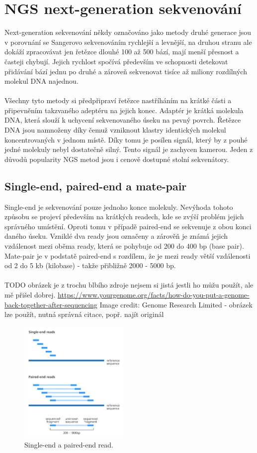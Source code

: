 \documentclass[czech,DP]{thesiskiv}
\numberwithin{equation}{section}
\begin{document}
\section{NGS next-generation sekvenování}
Next-generation sekvenování někdy označováno jako metody druhé generace jsou v porovnání se Sangerovo sekvenováním rychlejší a levnější, na druhou stranu ale dokáží zpracovávat jen řetězce dlouhé 100 až 500 bází, mají menší přesnost a časteji chybují. Jejich rychlost spočívá především ve schopnosti detekovat přidávání bází jednu po druhé a zároveň sekvenovat tisíce až miliony rozdílných molekul DNA najednou. 
\\
\\
Všechny tyto metody si předpřipraví řetězce nastříháním na krátké části a připevněním takzvaného adeptéru na jejich konec. Adaptér je krátká molekula DNA, která slouží k uchycení sekvenovaného úseku na pevný povrch. Řetězce DNA jsou namnoženy díky čemuž vzniknout klastry identických molekul koncentrovaných v jednom místě. Díky tomu je posílen signál, který by z pouhé jedné molekuly nebyl dostatečně silný. Tento signál je zachycen kamerou. Jeden z důvodů popularity NGS metod jsou i cenově dostupné stolní sekvenátory.
 
\subsection{Single-end, paired-end a mate-pair}
Single-end je sekvenování pouze jednoho konce molekuly. Nevýhoda tohoto způsobu se projeví především na krátkých readech, kde se zvýší problém jejich správného umístění. Oproti tomu v případě paired-end se sekvenuje z obou konci daného úseku. Vzniklé dva ready jsou označeny a zárověň je známá jejich vzdálenost mezi oběma ready, která se pohybuje od 200 do 400 bp (base pair). Mate-pair je v podstatě paired-end s rozdílem, že je mezi ready větší vzdálenosti od 2 do 5 kb (kilobase) - takže přibližně 2000 - 5000 bp. \cite{illumina}  
\\
\\
TODO obrázek je z trochu blbího zdroje nejsem si jistá jestli ho můžu použít, ale mě přišel dobrej. \url{https://www.yourgenome.org/facts/how-do-you-put-a-genome-back-together-after-sequencing}
Image credit: Genome Research Limited - obrázek lze použít, nutná správná citace, popř. najít originál

\begin{figure}[H]		
		\centering
		\includegraphics[width=200px]{./img/single_end_pair_end_reads_yourgenome.png}
		\caption{Single-end a paired-end read.}
		\label{fig:single_end_paired_end}
\end{figure} 
 
\end{document}
